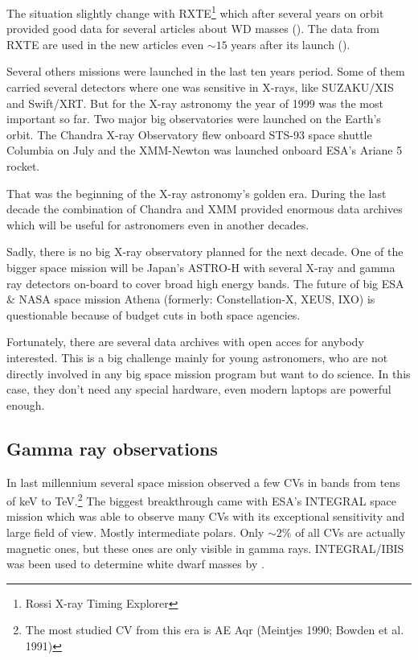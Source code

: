 \documentclass[oneside,a4paper,11pt]{report}
\begin{document}
The situation slightly change with RXTE\footnote{Rossi X-ray Timing Explorer} which after several 
years on orbit provided good data for several articles about WD masses (\citet{2005A&A...435..191S}). 
The data from RXTE are used in the new articles even $\sim15$ years after its launch (\citet{2011A&A...526A..77B}).
 
Several others missions were launched in the last ten years period. Some of them carried several 
detectors where one was sensitive in X-rays, like SUZAKU/XIS and Swift/XRT. But for the X-ray 
astronomy the year of 1999 was the most important so far. Two major big observatories 
were launched on the Earth's orbit. The Chandra X-ray Observatory flew onboard STS-93 space shuttle 
Columbia on July and the XMM-Newton was launched onboard ESA's Ariane 5 rocket.

   That was the beginning of the X-ray astronomy's golden era. During the last decade the combination of 
Chandra and XMM provided enormous data archives which will be useful for astronomers even in another 
decades. 

Sadly, there is no big X-ray observatory planned for the next decade. One of the bigger space 
mission will be Japan's ASTRO-H with several X-ray and gamma ray detectors on-board to cover broad 
high energy bands. The future of big ESA \& NASA space mission Athena (formerly: Constellation-X, 
XEUS, IXO)  is questionable because of budget cuts in both space agencies. 

Fortunately, there are several data archives with open acces for anybody 
interested. This is a big challenge mainly for young astronomers, who are 
not directly involved in any big space mission program but want to do science. In this case, 
they don't need any special hardware, even modern laptops are powerful enough.     



    
\subsection{Gamma ray observations}
In last millennium several space mission observed a few CVs in bands from tens of keV to TeV.\footnote{The most 
studied CV from this era is AE Aqr (Meintjes 1990; Bowden et al. 1991)}
The biggest breakthrough came with ESA's INTEGRAL space mission which was able to observe many CVs with its
exceptional sensitivity and large field of view. Mostly intermediate polars. Only $\sim 2\%$ 
of all CVs are actually magnetic ones, but these ones are only visible in gamma rays.
INTEGRAL/IBIS was been used to determine white dwarf masses by \citet{2009MNRAS.392..630L}.
\end{document}
